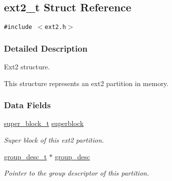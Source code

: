 \hypertarget{structext2__t}{
\subsection{ext2\_\-t Struct Reference}
\label{structext2__t}
}
{\tt \#include $<$ext2.h$>$}



\subsubsection{Detailed Description}
Ext2 structure.

This structure represents an ext2 partition in memory. 

\subsubsection*{Data Fields}
\begin{CompactItemize}
\item 
\hypertarget{structext2__t_m0}{
\hyperlink{structsuper__block__t}{super\_\-block\_\-t} \hyperlink{structext2__t_m0}{superblock}}
\label{structext2__t_m0}

\begin{CompactList}\small\item\em Super block of this ext2 partition.\item\end{CompactList}\item 
\hypertarget{structext2__t_m1}{
\hyperlink{structgroup__desc__t}{group\_\-desc\_\-t} $\ast$ \hyperlink{structext2__t_m1}{group\_\-desc}}
\label{structext2__t_m1}

\begin{CompactList}\small\item\em Pointer to the group descriptor of this partition.\item\end{CompactList}\end{CompactItemize}
